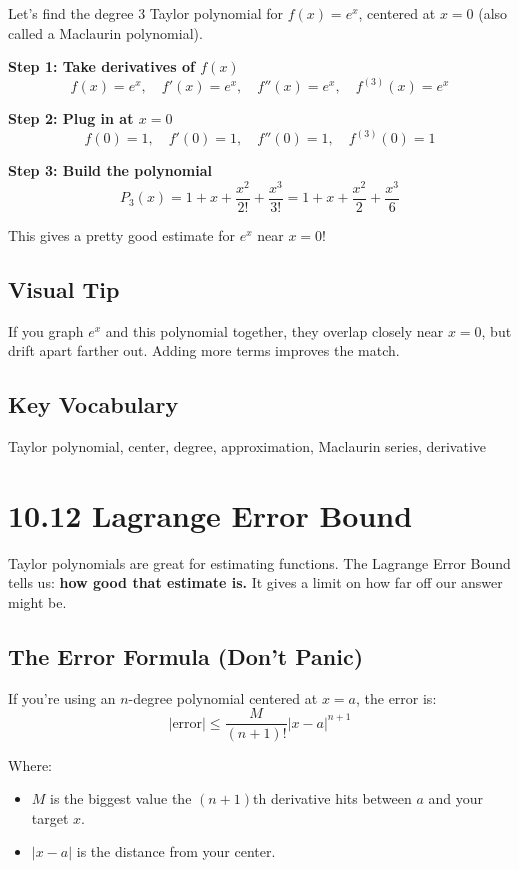 \documentclass{article}
\begin{document}
Let’s find the degree 3 Taylor polynomial for \(f(x) = e^x\), centered at \(x = 0\) (also called a Maclaurin polynomial).

\textbf{Step 1: Take derivatives of \(f(x)\)}
\[
f(x) = e^x,\quad f'(x) = e^x,\quad f''(x) = e^x,\quad f^{(3)}(x) = e^x
\]

\textbf{Step 2: Plug in at \(x = 0\)}
\[
f(0) = 1,\quad f'(0) = 1,\quad f''(0) = 1,\quad f^{(3)}(0) = 1
\]

\textbf{Step 3: Build the polynomial}
\[
P_3(x) = 1 + x + \frac{x^2}{2!} + \frac{x^3}{3!}
= 1 + x + \frac{x^2}{2} + \frac{x^3}{6}
\]

This gives a pretty good estimate for \(e^x\) near \(x = 0\)!

\subsection*{Visual Tip}
If you graph \(e^x\) and this polynomial together, they overlap closely near \(x = 0\), but drift apart farther out. Adding more terms improves the match.

\subsection*{Key Vocabulary}
Taylor polynomial, center, degree, approximation, Maclaurin series, derivative



\newpage
\section{10.12 Lagrange Error Bound}

\begin{tcolorbox}[colback=gray!8,colframe=black,title=Big-Idea (Plain Words)]
Taylor polynomials are great for estimating functions.  
The Lagrange Error Bound tells us: \textbf{how good that estimate is.}  
It gives a limit on how far off our answer might be.
\end{tcolorbox}

\subsection*{The Error Formula (Don’t Panic)}
If you’re using an \(n\)-degree polynomial centered at \(x = a\), the error is:
\[
| \text{error} | \le \frac{M}{(n+1)!} |x - a|^{n+1}
\]

Where:
\begin{itemize}
  \item \(M\) is the biggest value the \((n+1)\)th derivative hits between \(a\) and your target \(x\).
  \item \(|x - a|\) is the distance from your center.
\end{itemize}
\end{document}
